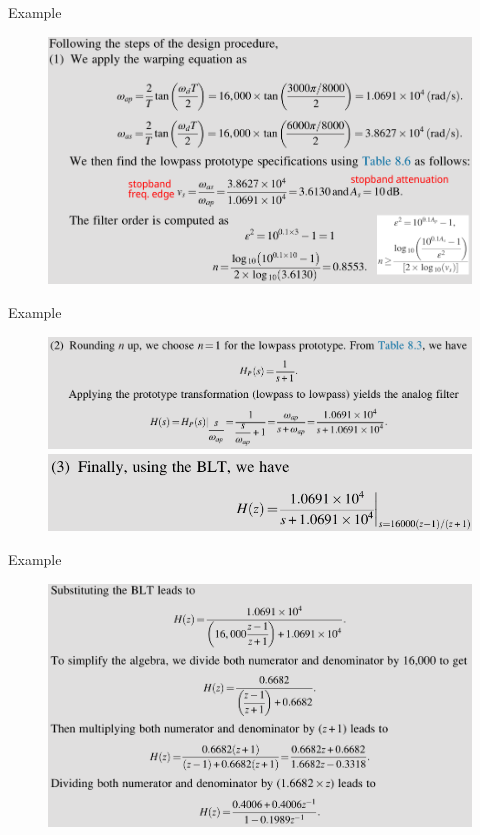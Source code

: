 \documentclass[pdflatex,compress,mathserif]{beamer}
\begin{document}
\begin{frame}{Example}
    \begin{figure}
        \centering
        \includegraphics[width=\linewidth]{./img/img19.png}
    \end{figure}
\end{frame}

\begin{frame}{Example}
    \begin{figure}
        \centering
        \includegraphics[width=\linewidth]{./img/img20.png}
        \includegraphics[width=\linewidth]{./img/img21.png}
    \end{figure}
\end{frame}

\begin{frame}{Example}
    \begin{figure}
        \centering
        \includegraphics[width=\linewidth]{./img/img22.png}
    \end{figure}
\end{frame}
\end{document}
